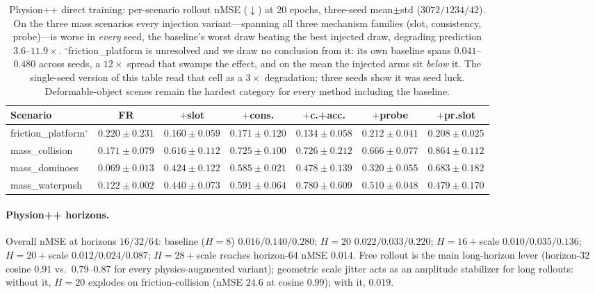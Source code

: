 \begin{table}[t]
\centering
\small
\setlength{\tabcolsep}{8pt}
\begin{tabular}{@{}lcccccc@{}}
\toprule
Scenario & FR & $+$slot & $+$cons. & $+$c.+acc. & $+$probe & $+$pr.slot \\
\midrule
friction\_platform$^{\circ}$ & $0.220{\pm}0.231$ & $0.160{\pm}0.059$ & $0.171{\pm}0.120$ & $0.134{\pm}0.058$ & $0.212{\pm}0.041$ & $0.208{\pm}0.025$ \\
mass\_collision & $\mathbf{0.171{\pm}0.079}$ & $0.616{\pm}0.112$ & $0.725{\pm}0.100$ & $0.726{\pm}0.212$ & $0.666{\pm}0.077$ & $0.864{\pm}0.112$ \\
mass\_dominoes & $\mathbf{0.069{\pm}0.013}$ & $0.424{\pm}0.122$ & $0.585{\pm}0.021$ & $0.478{\pm}0.139$ & $0.320{\pm}0.055$ & $0.683{\pm}0.182$ \\
mass\_waterpush & $\mathbf{0.122{\pm}0.002}$ & $0.440{\pm}0.073$ & $0.591{\pm}0.064$ & $0.780{\pm}0.609$ & $0.510{\pm}0.048$ & $0.479{\pm}0.170$ \\
\bottomrule
\end{tabular}
\caption{Physion++ direct training: per-scenario rollout nMSE ($\downarrow$) at $20$ epochs, three-seed mean$\pm$std ($3072/1234/42$). On the three mass scenarios every injection variant---spanning all three mechanism families (slot, consistency, probe)---is worse in \emph{every} seed, the baseline's worst draw beating the best injected draw, degrading prediction $3.6$--$11.9\times$. $^{\circ}$friction\_platform is unresolved and we draw no conclusion from it: its own baseline spans $0.041$--$0.480$ across seeds, a $12\times$ spread that swamps the effect, and on the mean the injected arms sit \emph{below} it. The single-seed version of this table read that cell as a $3\times$ degradation; three seeds show it was seed luck. Deformable-object scenes remain the hardest category for every method including the baseline.}
\label{tab:pp}
\end{table}

\paragraph{Physion++ horizons.}
Overall nMSE at horizons $16/32/64$: baseline ($H{=}8$) $0.016/0.140/0.280$; $H{=}20$ $0.022/0.033/0.220$; $H{=}16{+}$scale $0.010/0.035/0.136$; $H{=}20{+}$scale $0.012/0.024/0.087$; $H{=}28{+}$scale reaches horizon-$64$ nMSE $0.014$. Free rollout is the main long-horizon lever (horizon-$32$ cosine $0.91$ vs.\ $0.79$--$0.87$ for every physics-augmented variant); geometric scale jitter acts as an amplitude stabilizer for long rollouts: without it, $H{=}20$ explodes on friction-collision (nMSE $24.6$ at cosine $0.99$); with it, $0.019$.

